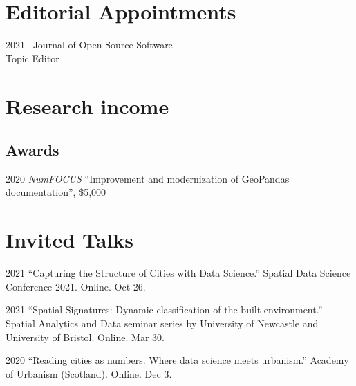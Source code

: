 \documentclass[12pt,a4paper]{report}
\begin{document}
    \section*{Editorial Appointments}

    \begin{tablist}

        \item[2021--] \tab{}Journal of Open Source Software \\
                            Topic Editor

    \end{tablist}

    \section*{Research income}

    \subsection*{Awards}

    \begin{tablist}

        \item[2020] \tab{}\textit{NumFOCUS} \enquote{Improvement and modernization of GeoPandas documentation}, \$5,000

    \end{tablist}

    \section*{Invited Talks}

    \begin{tablist}

        \item[2021] \tab{}\enquote{Capturing the Structure of Cities with Data Science.} Spatial Data Science Conference 2021. Online. Oct 26.

        \item[2021] \tab{}\enquote{Spatial Signatures: Dynamic classification of the built environment.} Spatial Analytics and Data seminar series by University of Newcastle and University of Bristol. Online. Mar 30.

        \item[2020] \tab{}\enquote{Reading cities as numbers. Where data science meets urbanism.} Academy of Urbanism (Scotland). Online. Dec 3.

    \end{tablist}
\end{document}
